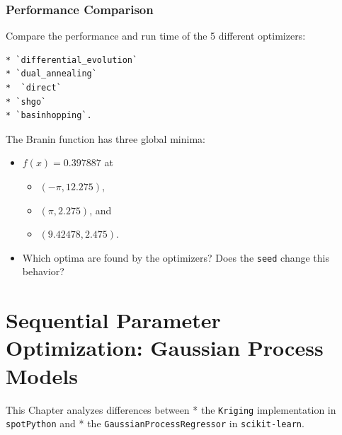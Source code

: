 \documentclass[
  letterpaper,
  DIV=11,
  numbers=noendperiod]{scrreprt}
\providecommand{\tightlist}{%
  \setlength{\itemsep}{0pt}\setlength{\parskip}{0pt}}\usepackage{longtable,booktabs,array}
\begin{document}
\hypertarget{performance-comparison}{%
\subsection{Performance Comparison}\label{performance-comparison}}

Compare the performance and run time of the 5 different optimizers:

\begin{verbatim}
* `differential_evolution`
* `dual_annealing`
*  `direct`
* `shgo`
* `basinhopping`.
\end{verbatim}

The Branin function has three global minima:

\begin{itemize}
\tightlist
\item
  \(f(x) = 0.397887\) at

  \begin{itemize}
  \tightlist
  \item
    \((-\pi, 12.275)\),
  \item
    \((\pi, 2.275)\), and
  \item
    \((9.42478, 2.475)\).\\
  \end{itemize}
\item
  Which optima are found by the optimizers? Does the \texttt{seed}
  change this behavior?
\end{itemize}

\hypertarget{sec-gaussian-process-models}{%
\chapter{Sequential Parameter Optimization: Gaussian Process
Models}\label{sec-gaussian-process-models}}

This Chapter analyzes differences between * the \texttt{Kriging}
implementation in \texttt{spotPython} and * the
\texttt{GaussianProcessRegressor} in \texttt{scikit-learn}.
\end{document}
